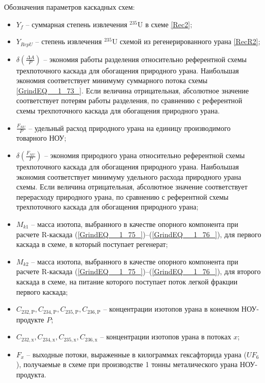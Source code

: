 Обозначения параметров каскадных схем:
\begin{itemize}
    \item $Y_f$ -- суммарная степень извлечения $^{235}$U в схеме \ref{Rec2};
    \item $Y_{RepU}$ -- степень извлечения $^{235}$U схемой из регенерированного урана \ref{RecR2};
    \item $\delta(\frac{\Delta A}{P})$ -- экономия работы разделения относительно референтной схемы трехпоточного каскада для обогащения природного урана. Наибольшая экономия соответствует минимуму суммарного потока схемы \ref{GrindEQ__1_73_}. Если величина отрицательная, абсолютное значение соответствует потерям работы разделения, по сравнению с референтной схемы трехпоточного каскада для обогащения природного урана.
    \item  $\frac{F_{NU}}{P}$ -- удельный расход природного урана на единицу производимого товарного НОУ;
    \item  $\delta(\frac{F_{NU}}{P})$ -- экономия природного урана относительно референтной схемы трехпоточного каскада для обогащения природного урана.  Наибольшая экономия соответствует минимуму удельного расхода природного урана схемы. Если величина отрицательная, абсолютное значение соответствует перерасходу природного урана, по сравнению с референтной схемы трехпоточного каскада для обогащения природного урана;
    \item $M_{k1}$ -- масса изотопа, выбранного в качестве опорного компонента при расчете R-каскада (\ref{GrindEQ__1_75_})--(\ref{GrindEQ__1_76_}), для первого каскада в схеме, в который поступает регенерат;
    \item $M_{k2}$ -- масса изотопа, выбранного в качестве опорного компонента при расчете R-каскада (\ref{GrindEQ__1_75_})--(\ref{GrindEQ__1_76_}), для второго каскада в схеме, на питание которого поступает поток легкой фракции первого каскада;
    \item $C_{232,\text{P}},C_{234,\text{P}},C_{235,\text{P}},C_{236,\text{P}}$ -- концентрации изотопов урана в конечном НОУ-продукте $P$;
    \item $C_{232,\text{x}},C_{234,\text{x}},C_{235,\text{x}},C_{236,\text{x}}$ -- концентрации изотопов урана в потоках $x$;
    \item $F_{x}$ -- выходные потоки, выраженные в килограммах гексафторида урана ($UF_6$), получаемые в схеме при производстве 1 тонны металического урана НОУ-продукта.
  \end{itemize}
  
\addtocounter{table}{-1}%
